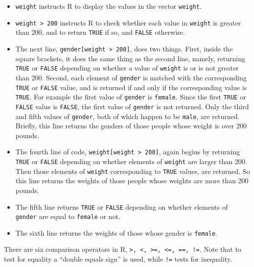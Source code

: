 \documentclass[12pt,oneside]{book}\usepackage[]{graphicx}\usepackage[]{color}
\begin{document}
\begin{itemize}
\item \verb+weight+ instructs R to display the values in the vector \verb+weight+.
\item \verb+weight > 200+ instructs R to check whether each value in \verb+weight+ is greater than 200, and to return \verb+TRUE+ if so, and \verb+FALSE+ otherwise.
\item The next line, \verb+gender[weight > 200]+, does two things. First, inside the square brackets, it does the same thing as the second line, namely, returning \verb+TRUE+ or \verb+FALSE+ depending on whether a value of \verb+weight+ is or is not greater than 200. Second, each element of \verb+gender+ is matched with the corresponding \verb+TRUE+ or \verb+FALSE+ value, and is returned if and only if the corresponding value is \verb+TRUE+. For example the first value of \verb+gender+ is \verb+female+. Since the first \verb+TRUE+ or \verb+FALSE+ value is \verb+FALSE+, the first value of \verb+gender+ is not returned. Only the third and fifth values of \verb+gender+, both of which happen to be \verb+male+, are returned. Briefly, this line returns the genders of those people whose weight is over 200 pounds.
\item The fourth line of code, \verb+weight[weight > 200]+, again begins by returning \verb+TRUE+ or \verb+FALSE+ depending on whether elements of \verb+weight+ are larger than 200. Then those elements of \verb+weight+ corresponding to \verb+TRUE+ values, are returned. So this line returns the weights of those people whose weights are more than 200 pounds.
\item The fifth line returns \verb+TRUE+ or \verb+FALSE+ depending on whether elements of \verb+gender+ are equal to \verb+female+ or not. 
\item The sixth line returns the weights of those whose gender is \verb+female+.
\end{itemize}


There are six comparison operators in R, \verb+>, <, >=, <=, ==, !=+. Note that to test for equality a ``double equals sign'' is used, while \verb+!=+ tests for inequality.
\end{document}
